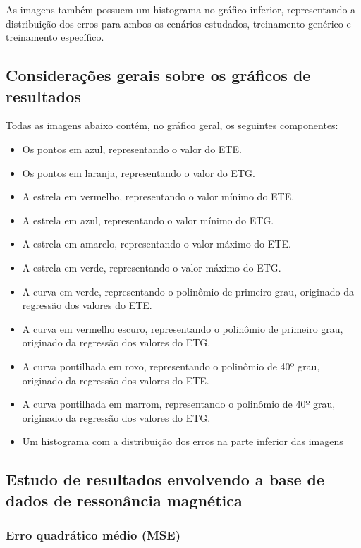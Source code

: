 As imagens também possuem um histograma no gráfico inferior, representando a distribuição dos erros para ambos os cenários estudados, treinamento genérico e treinamento específico.

\subsection{Considerações gerais sobre os gráficos de resultados}
\label{sec:result:consideracoes-gerais}

Todas as imagens abaixo contém, no gráfico geral, os seguintes componentes:

\begin{itemize}
    \item Os pontos em azul, representando o valor do ETE.
    \item Os pontos em laranja, representando o valor do ETG.
    \item A estrela em vermelho, representando o valor mínimo do ETE.
    \item A estrela em azul, representando o valor mínimo do ETG.
    \item A estrela em amarelo, representando o valor máximo do ETE.
    \item A estrela em verde, representando o valor máximo do ETG.
    \item A curva em verde, representando o polinômio de primeiro grau, originado da regressão dos valores do ETE.
    \item A curva em vermelho escuro, representando o polinômio de primeiro grau, originado da regressão dos valores do ETG.
    \item A curva pontilhada em roxo, representando o polinômio de 40º grau, originado da regressão dos valores do ETE.
    \item A curva pontilhada em marrom, representando o polinômio de 40º grau, originado da regressão dos valores do ETG.
    \item Um histograma com a distribuição dos erros na parte inferior das imagens
\end{itemize}

\subsection{Estudo de resultados envolvendo a base de dados de ressonância magnética}
\label{sec:result:mri}
\subsubsection{Erro quadrático médio (MSE)}
\label{sec:result:mri:mse}

